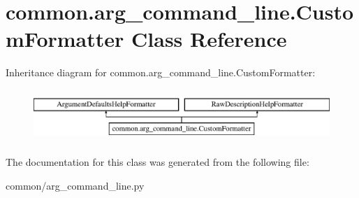 \hypertarget{classcommon_1_1arg__command__line_1_1_custom_formatter}{}\section{common.\+arg\+\_\+command\+\_\+line.\+Custom\+Formatter Class Reference}
\label{classcommon_1_1arg__command__line_1_1_custom_formatter}
Inheritance diagram for common.\+arg\+\_\+command\+\_\+line.\+Custom\+Formatter\+:\begin{figure}[H]
\begin{center}
\leavevmode
\includegraphics[height=2.000000cm]{classcommon_1_1arg__command__line_1_1_custom_formatter}
\end{center}
\end{figure}


The documentation for this class was generated from the following file\+:\begin{DoxyCompactItemize}
\item 
common/arg\+\_\+command\+\_\+line.\+py\end{DoxyCompactItemize}
